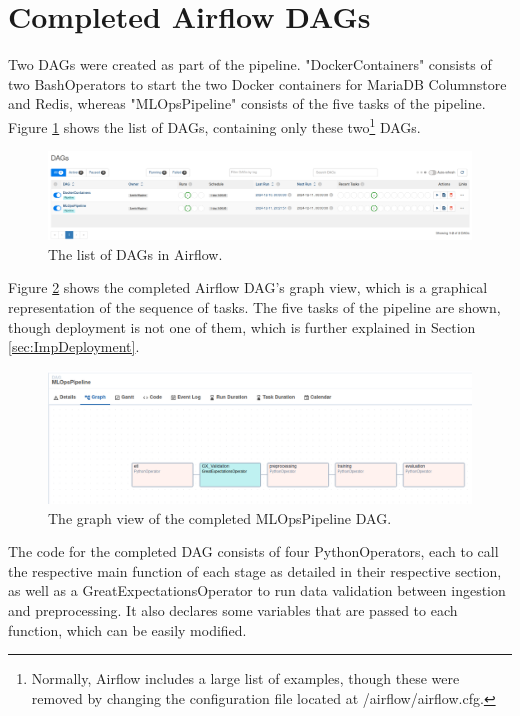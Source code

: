 \documentclass[12pt]{report}
\begin{document}
\section{Completed Airflow DAGs}\label{sec:CompletedDAGs}
Two DAGs were created as part of the pipeline. "DockerContainers" consists of two BashOperators 
to start the two Docker containers for MariaDB Columnstore and Redis, whereas "MLOpsPipeline" 
consists of the five tasks of the pipeline. Figure \ref{fig:DAGsList} shows the list of DAGs, 
containing only these two\footnote{Normally, Airflow includes a large list of examples, though these were 
removed by changing the configuration file located at \texttildelow/airflow/airflow.cfg.} DAGs.

\begin{figure}[H]
    \centering
    \includegraphics[width=\linewidth]{Implementation/Airflow/DAGs/1.png}
    \caption{The list of DAGs in Airflow.}
    \label{fig:DAGsList}
\end{figure}

Figure \ref{fig:PipelineGraphDAG} shows the completed Airflow DAG's graph view, which is a graphical 
representation of the sequence of tasks. The five tasks of the pipeline are shown, 
though deployment is not one of them, which is further explained in Section \ref{sec:ImpDeployment}.

\begin{figure}[H]
    \centering
    \includegraphics[width=\linewidth]{Implementation/Airflow/DAGs/PipelineGraph.png}
    \caption{The graph view of the completed MLOpsPipeline DAG.}
    \label{fig:PipelineGraphDAG}
\end{figure}

The code for the completed DAG consists of four PythonOperators, each to call the respective main 
function of each stage as detailed in their respective section, as well as a GreatExpectationsOperator 
to run data validation between ingestion and preprocessing. It also declares some variables that are passed 
to each function, which can be easily modified.
\end{document}
